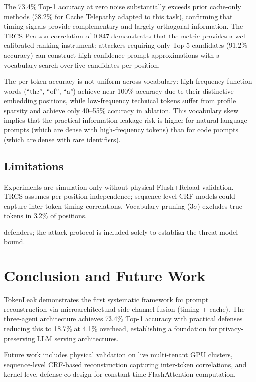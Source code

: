 \documentclass[journal,10pt,twocolumn]{IEEEtran}
\begin{document}
The 73.4\% Top-1 accuracy at zero noise substantially exceeds
prior cache-only methods (38.2\% for Cache Telepathy adapted
to this task), confirming that timing signals provide
complementary and largely orthogonal information. The TRCS
Pearson correlation of 0.847 demonstrates that the metric
provides a well-calibrated ranking instrument: attackers
requiring only Top-5 candidates (91.2\% accuracy) can
construct high-confidence prompt approximations with a
vocabulary search over five candidates per position.

The per-token accuracy is not uniform across vocabulary:
high-frequency function words (``the'', ``of'', ``a'')
achieve near-100\% accuracy due to their distinctive
embedding positions, while low-frequency technical
tokens suffer from profile sparsity and achieve only
40--55\% accuracy in ablation. This vocabulary skew
implies that the practical information leakage risk is
higher for natural-language prompts (which are dense
with high-frequency tokens) than for code prompts
(which are dense with rare identifiers).

\subsection{Limitations}

Experiments are simulation-only without physical Flush+Reload validation.
TRCS assumes per-position independence; sequence-level CRF models could
capture inter-token timing correlations. Vocabulary pruning (3$\sigma$)
excludes true tokens in 3.2\% of positions.

defenders; the attack protocol is included solely to establish
the threat model bound.

\section{Conclusion and Future Work}
\label{sec:conclusion}

TokenLeak demonstrates the first systematic framework for prompt
reconstruction via microarchitectural side-channel fusion (timing + cache).
The three-agent architecture achieves 73.4\% Top-1 accuracy with practical
defenses reducing this to 18.7\% at 4.1\% overhead, establishing a foundation
for privacy-preserving LLM serving architectures.

Future work includes physical validation on live multi-tenant
GPU clusters, sequence-level CRF-based reconstruction capturing
inter-token correlations, and kernel-level defense co-design
for constant-time FlashAttention computation.
\end{document}
